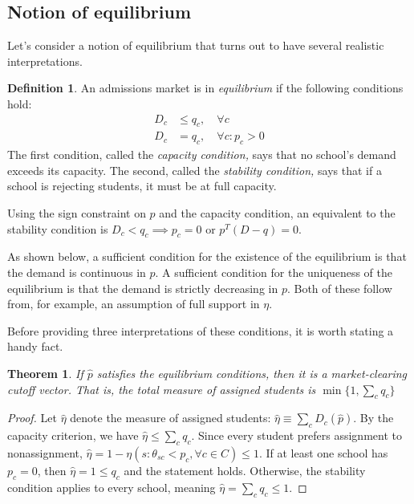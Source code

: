 \documentclass[12pt]{article}
\newtheorem{theorem}{Theorem}
\theoremstyle{definition}
\newtheorem{definition}{Definition}
\begin{document}
\subsection{Notion of equilibrium}
Let's consider a notion of equilibrium that turns out to have several realistic interpretations. 

\begin{definition} \label{marketeqconditions} An admissions market is in \emph{equilibrium} if the following conditions hold:
\begin{align} D_c &\leq q_c, \quad \forall c \label{capacitycondition} \\
D_c &= q_c, \quad \forall c: p_c > 0 \label{stabilitycondition}
\end{align}
The first condition, called the \emph{capacity condition,} says that no school's demand exceeds its capacity. The second, called the \emph{stability condition,} says that if a school is rejecting students, it must be at full capacity.
\end{definition}


Using the sign constraint on $p$ and the capacity condition, an equivalent to the stability condition is $D_c < q_c \implies p_c = 0$ or $p^T \left(D - q\right) = 0$.

As shown below, a sufficient condition for the existence of the equilibrium is that the demand is continuous in $p$. A sufficient condition for the uniqueness of the equilibrium is that the demand is strictly decreasing in $p$. Both of these follow from, for example, an assumption of full support in $\eta$. 

Before providing three interpretations of these conditions, it is worth stating a handy fact. 

\begin{theorem}If $\hat p$ satisfies the equilibrium conditions, then it is a market-clearing cutoff vector. That is, the total measure of assigned students is $\min\{1, \sum_c q_c\}$
\end{theorem}

\begin{proof}Let $\hat \eta$ denote the measure of assigned students: $\hat \eta \equiv \sum_c D_c(\hat p)$. By the capacity criterion, we have $\hat \eta \leq \sum_c q_c$. Since every student prefers assignment to nonassignment, $\hat \eta = 1 - \eta ( s: \theta_{sc} < p_c, \forall c \in C) \leq 1$. If at least one school has $p_c = 0$, then $\hat \eta = 1 \leq q_c$ and the statement holds. Otherwise, the stability condition applies to every school, meaning $\hat \eta = \sum_c q_c \leq 1$. \end{proof}
\end{document}
